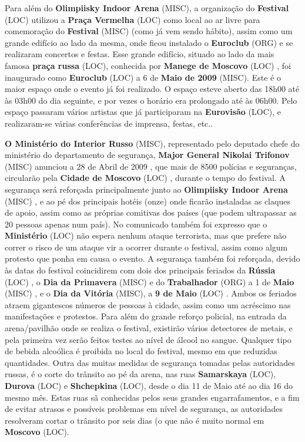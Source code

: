 \documentclass[12pt,a4paper]{article}
\begin{document}
Para além do \textbf{Olimpiisky Indoor Arena} (MISC), a organização do \textbf{Festival} (LOC) utilizou a \textbf{Praça Vermelha} (LOC) como local ao ar livre para comemoração do \textbf{Festival} (MISC) (como já vem sendo hábito), assim como um grande edifício ao lado da mesma, onde ficou instalado o \textbf{Euroclub} (ORG) e se realizaram concertos e festas. Esse grande edifício, situado ao lado da mais famosa \textbf{praça russa} (LOC), conhecida por \textbf{Manege de Moscovo} (LOC) , foi inaugurado como \textbf{Euroclub} (LOC) a 6 de \textbf{Maio de 2009} (MISC). Este é o maior espaço onde o evento já foi realizado. O espaço esteve aberto das 18h00 até às 03h00 do dia seguinte, e por vezes o horário era prolongado até às 06h00. Pelo espaço passaram vários artistas que já participaram na \textbf{Eurovisão} (LOC), e realizaram-se várias conferências de imprensa, festas, etc..

\textbf{O Ministério do Interior Russo} (MISC), representado pelo deputado chefe do ministério do departamento de segurança, \textbf{Major General Nikolai Trifonov} (MISC) anunciou a 28 de Abril de 2009 , que mais de 8500 polícias e seguranças, circularão pela \textbf{Cidade de Moscovo} (LOC) , durante o tempo do festival. A segurança será reforçada principalmente junto ao \textbf{Olimpiisky Indoor Arena} (MISC) , e ao pé dos principais hotéis (onze) onde ficarão instaladas as claques de apoio, assim como as próprias comitivas dos países (que podem ultrapassar as 20 pessoas apenas num país). No comunicado também foi expresso que o \textbf{Ministério} (LOC) não espera nenhum ataque terrorista, mas que prefere não correr o risco de um ataque vir a ocorrer durante o festival, assim como algum protesto que ponha em causa o evento. A segurança também foi reforçada, devido às datas do festival coincidirem com dois dos principais feriados da \textbf{Rússia} (LOC) , o \textbf{Dia da Primavera} (MISC) e do \textbf{Trabalhador} (ORG) a 1 de \textbf{Maio} (MISC) , e o \textbf{Dia da Vitória} (MISC), a \textbf{9 de Maio} (LOC) . Ambos os feriados atraem gigantescos números de pessoas à cidade, assim como um acréscimo nas manifestações e protestos. Para além do grande reforço policial, na entrada da arena/pavilhão onde se realiza o festival, existirão vários detectores de metais, e pela primeira vez serão feitos testes ao nível de álcool no sangue. Qualquer tipo de bebida alcoólica é proibida no local do festival, mesmo em que reduzidas quantidades. Outra das muitas medidas de segurança tomadas pelas autoridades russas, é o corte do trânsito ao pé da arena, nas ruas \textbf{Samarskaya} (LOC), \textbf{Durova} (LOC) e \textbf{Shchepkina} (LOC), desde o dia 11 de Maio até ao dia 16 do mesmo mês. Estas ruas sã conhecidas pelos seus grandes engarrafamentos, e a fim de evitar atrasos e possíveis problemas em nível de segurança, as autoridades resolveram cortar o trânsito por seis dias (o que não é muito normal em \textbf{Moscovo} (LOC).
\end{document}
